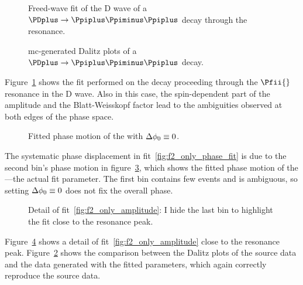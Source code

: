     \begin{figure}
        \centering

        \subfloat[][\label{fig:f2_only_phase_fit}]{}

        \subfloat[][\label{fig:f2_only_amplitude}]{}

        \caption{Freed-wave fit of the D wave of a $\PDplus \to \Ppiplus\Ppiminus\Ppiplus$ decay through the \Pfii{} resonance.~\Square}
        \label{fig:f2_only}
    \end{figure}
    \begin{figure}
        \centering


        \caption{\ac{mc}-generated Dalitz plots of a $\PDplus \to \Ppiplus\Ppiminus\Ppiplus$ decay.~\Square}
        \label{fig:f2_only_dalitz}

    \end{figure}
    Figure~\ref{fig:f2_only} shows the fit performed on the decay proceeding through the $\Pfii{}$ resonance in the D wave.
    Also in this case, the spin-dependent part of the amplitude and the Blatt-Weisskopf factor lead to the ambiguities observed at both edges of the phase space.
    \begin{figure}
        \centering
        
        \caption{Fitted phase motion of the \Pfii{} with $\mathop{}\!\textup{$\Delta$}\phi_0 \equiv 0$.~\Square}
        \label{fig:fit_f2_phase_motion}
    \end{figure}
    The systematic phase displacement in fit~\ref{fig:f2_only_phase_fit} is due to the second bin's phase motion in figure~\ref{fig:fit_f2_phase_motion}, which shows the fitted phase motion of the \Pfii{}---the actual fit parameter.
    The first bin contains few events and is ambiguous, so setting $\mathop{}\!\textup{$\Delta$} \phi_0 \equiv 0$ does not fix the overall phase.
    \begin{figure}
        \centering
        
        \caption{Detail of fit~\ref{fig:f2_only_amplitude}: I hide the last bin to highlight the fit close to the resonance peak.~\Square}
        \label{fig:f2_only_amplitude_zoom}
    \end{figure}
    Figure~\ref{fig:f2_only_amplitude_zoom} shows a detail of fit~\ref{fig:f2_only_amplitude} close to the resonance peak.
    Figure~\ref{fig:f2_only_dalitz} shows the comparison between the Dalitz plots of the source data and the data generated with the fitted parameters, which again correctly reproduce the source data.
